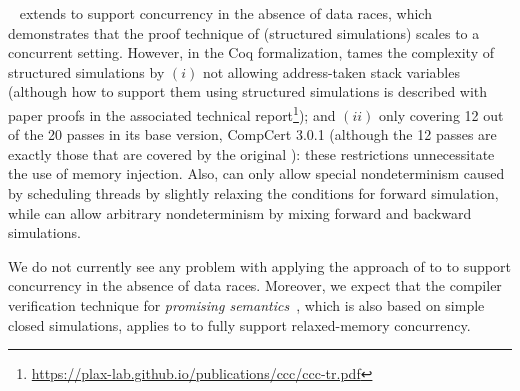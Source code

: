 {%

\cascc{}~\cite{jiang:cascc} extends \ccc{} to support concurrency in
the absence of data races, which demonstrates that the proof technique
of \ccc{} (\ie structured simulations) scales to a
concurrent setting.  However, in the Coq formalization, \ccc{} tames
the complexity of structured simulations by $(i)$ not allowing
address-taken stack variables (although how to support them using
structured simulations is described with paper proofs in the
associated technical report\footnote{\url{https://plax-lab.github.io/publications/ccc/ccc-tr.pdf}}); and $(ii)$ only
covering 12 out of the 20 passes in its base version, CompCert 3.0.1
(although the 12 passes are exactly those that are covered by the
original \ccc{}): these restrictions unnecessitate the use of memory
injection. Also, \cascc{} can only allow special nondeterminism caused
by scheduling threads by slightly relaxing the conditions for forward
simulation, while \ccm{} can allow arbitrary nondeterminism by mixing
forward and backward simulations.

We do not currently see any problem with applying the approach of
\cascc{} to \ccm{} to support concurrency in the absence of data races.
Moreover, we expect that the compiler verification technique for
\emph{promising semantics}~\cite{Kang:promising}, which is also based
on simple closed simulations, applies to \ccm{} to fully support
relaxed-memory concurrency.

}
